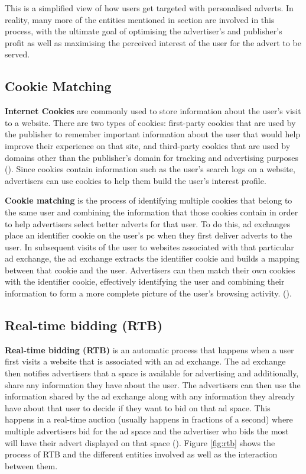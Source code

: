 \documentclass{l4proj}
\begin{document}
This is a simplified view of how users get targeted with personalised adverts. In reality, many more of the entities mentioned in section  are involved in this process, with the ultimate goal of optimising the advertiser's and publisher's profit as well as maximising the perceived interest of the user for the advert to be served.

\subsection{Cookie Matching}
\textbf{Internet Cookies} are commonly used to store information about the user's visit to a website. There are two types of cookies: first-party cookies that are used by the publisher to remember important information about the user that would help improve their experience on that site, and third-party cookies that are used by domains other than the publisher's domain for tracking and advertising purposes (\cite{Estrada-Jimenez2017}). Since cookies contain information such as the user's search logs on a website, advertisers can use cookies to help them build the user's interest profile. 

\textbf{Cookie matching} is the process of identifying multiple cookies that belong to the same user and combining the information that those cookies contain in order to help advertisers select better adverts for that user. To do this, ad exchanges place an identifier cookie on the user's pc when they first deliver adverts to the user. In subsequent visits of the user to websites associated with that particular ad exchange, the ad exchange extracts the identifier cookie and builds a mapping between that cookie and the user. Advertisers can then match their own cookies with the identifier cookie, effectively identifying the user and combining their information to form a more complete picture of the user's browsing activity. (\cite{cm}).

\subsection{Real-time bidding (RTB)}
\textbf{Real-time bidding (RTB)} is an automatic process that happens when a user first visits a website that is associated with an ad exchange. The ad exchange then notifies advertisers that a space is available for advertising and additionally, share any information they have about the user. The advertisers can then use the information shared by the ad exchange along with any information they already have about that user to decide if they want to bid on that ad space. This happens in a real-time auction (usually happens in fractions of a second) where multiple advertisers bid for the ad space and the advertiser who bids the most will have their advert displayed on that space (\cite{RTB}). Figure \ref{fig:rtb} shows the process of RTB and the different entities involved as well as the interaction between them.
\end{document}
